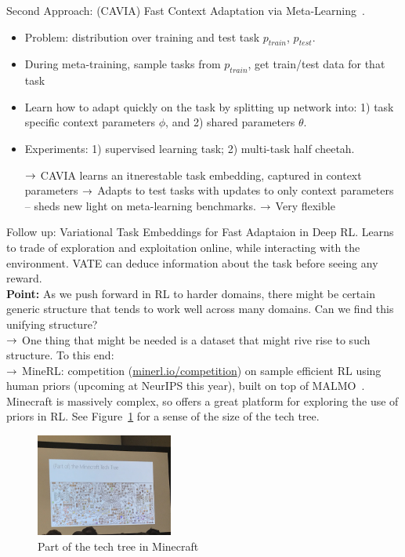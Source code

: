 Second Approach: (CAVIA) Fast Context Adaptation via Meta-Learning~\cite{zintgraf2018caml}.
\begin{itemize}
    \item Problem: distribution over training and test task $p_{train}$, $p_{test}$.
    \item During meta-training, sample tasks from $p_{train}$, get train/test data for that task
    \item Learn how to adapt quickly on the task by splitting up network into: 1) task specific context parameters $\phi$, and 2) shared parameters $\theta$.
    \item Experiments: 1) supervised learning task; 2) multi-task half cheetah.
    
    $\rightarrow$ CAVIA learns an itnerestable task embedding, captured in context parameters
    $\rightarrow$ Adapts to test tasks with updates to only context parameters -- sheds new light on meta-learning benchmarks.
    $\rightarrow$ Very flexible
\end{itemize}

Follow up: Variational Task Embeddings for Fast Adaptaion in Deep RL. Learns to trade of exploration and exploitation online, while interacting with the environment. VATE can deduce information about the task before seeing any reward. \\


{\bf Point:} As we push forward in RL to harder domains, there might be certain generic structure that tends to work well across many domains. Can we find this unifying structure? \\

$\rightarrow$ One thing that might be needed is a dataset that might rive rise to such structure. To this end: \\

$\rightarrow$ MineRL: competition (\url{minerl.io/competition}) on sample efficient RL using human priors (upcoming at NeurIPS this year), built on top of MALMO~\cite{johnson2016malmo}. \\

Minecraft is massively complex, so offers a great platform for exploring the use of priors in RL. See Figure~\ref{fig:mc_tree} for a sense of the size of the tech tree.

\begin{figure}[h!]
    \centering
    \includegraphics[width=0.4\textwidth]{images/mc_tree.JPG}
    \caption{Part of the tech tree in Minecraft}
    \label{fig:mc_tree}
\end{figure}

